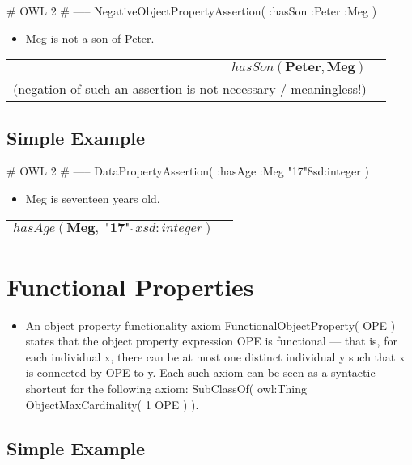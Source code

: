 \documentclass{llncs}
\newenvironment{DL}{
	\begin{center}
  \begin{tabular}{r l}

}{
  \end{tabular}
	\end{center}
}
\begin{document}
\begin{ex}
# OWL 2
# -----
NegativeObjectPropertyAssertion( :hasSon :Peter :Meg )
\end{ex}

\begin{itemize}
	\item Meg is not a son of Peter.
\end{itemize}

\begin{DL}
$hasSon(\textbf{Peter},\textbf{Meg})$\\
(negation of such an assertion is not necessary / meaningless!)
\end{DL}

\subsection{Simple Example}

\begin{ex}
# OWL 2
# -----
DataPropertyAssertion( :hasAge :Meg "17"^^xsd:integer )
\end{ex}

\begin{itemize}
	\item Meg is seventeen years old. 
\end{itemize}

\begin{DL}
$hasAge ( \textbf{Meg} ,\textbf{ "17"}\hat{\ } \hat{\ } xsd:integer ) $\\
\end{DL}

\section{Functional Properties}



\begin{itemize}
	\item An object property functionality axiom FunctionalObjectProperty( OPE ) states that the object property expression OPE is functional — that is, for each individual x, there can be at most one distinct individual y such that x is connected by OPE to y. Each such axiom can be seen as a syntactic shortcut for the following axiom: SubClassOf( owl:Thing ObjectMaxCardinality( 1 OPE ) ).
\end{itemize}

\subsection{Simple Example}
\end{document}
